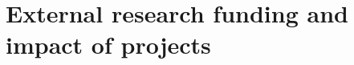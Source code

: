 \documentclass[11pt]{article}
\begin{document}
    \maketitle
    \setcounter{section}{6}
    \section{External research funding and impact of projects}

    \makeatletter



    
    \newcommand\grant[1][]{%
      \setkeys{grant}{#1}
        \noindent
        {\bf \mytitle}\\
        {\bf Principal investigator:} \myprincipalinvestigator\\
        \ifthenelse{\not\equal{\myotherinvestigators}{}}{{\bf Other investigators:} \myotherinvestigators\newline}{}
        {\bf Dates:} \mydates\\
        {\bf Funding agency:} \myfundingagency\\
        {\bf Financial value:} \myvalue\\%
        \ifthenelse{\not\equal{\mymainoutcomes}{}}{{\bf Main outcomes:} \mymainoutcomes\\}{}
        \ifthenelse{\not\equal{\mysummary}{}}{{\bf Summary:} \mysummary\\}{}
    }
    \newcommand\epsrc{ (EPSRC contribution)}
    \newcommand\UoS[1]{ (\textsterling #1 for the University of Strathclyde)}
    \newcommand\ofwhichUoS[1]{ of which \textsterling #1 for the University of Strathclyde}
\end{document}
